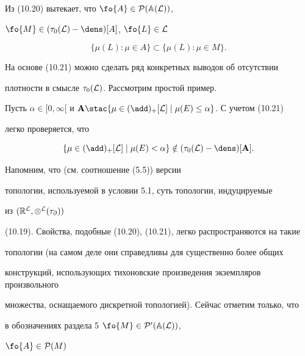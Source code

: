 Из (10.20) вытекает, что $\fo{A} \in {{\cal P}({\Bbb A}({\cal L}))}$,


$\fo{M} \in ({{\tau}_0}({\cal L}) - {\dens})[A]$, $\fo{L} \in {\cal L}$


\begin{equation}


\{{\mu}(L):\mu \in A\} \subset \{{\mu}(L):\mu \in M\}.


\end{equation}





\begin{notes}


На основе (10.21) можно сделать ряд конкретных выводов об отсутствии


плотности в смысле ${{\tau}_0}({\cal L})$. Рассмотрим простой пример.


Пусть $\alpha \in [0,\infty[$ и ${\bold A} \stac \{\mu \in


{(\add)_+}[{\cal L}] \mid {{\mu}(E)} \le \alpha\}$. С учетом (10.21)


легко проверяется, что


$$


\{\mu \in {(\add)_+}[{\cal L}] \mid {{\mu}(E)} < \alpha\} \notin


({{\tau}_0}({\cal L}) - {\dens})[{\bold A}].


$$


\end{notes}





Напомним, что (см. соотношение (5.5)) версии


топологии, используемой в условии 5.1, суть топологии, индуцируемые


из $({{\Bbb R}^{\cal L}},{{\otimes}^{\cal L}}({\tau_\partial}))$


(10.19). Свойства, подобные (10.20), (10.21), легко распространяются на такие


топологии (на самом деле они справедливы для существенно более общих


конструкций, использующих тихоновские произведения экземпляров произвольного


множества, оснащаемого дискретной топологией). Сейчас отметим только, что


в обозначениях раздела 5\; $\fo{M} \in {{\cal P}'({\Bbb A}({\cal L}))}$,


$\fo{A} \in {{\cal P}(M)}$


